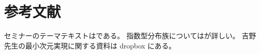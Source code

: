 \documentclass[report, notitlepage]{jlreq}
\begin{document}
\tableofcontents
\markboth{\contentsname}{}

%


%


%


%




%
\newpage
{}
{}
\renewcommand{\bibname}{参考文献}
\markboth{\bibname}{}
\part*{参考文献}

セミナーのテーマテキストは\cite{amari_information_2016}である。
指数型分布族については\cite{BN78}が詳しい。
吉野先生の最小次元実現に関する資料\cite{bn1970_pdf}は dropbox にある。

\nocite{amari_methods_2007}
\nocite{wainwright_graphical_2007}
\nocite{dudley_18466_2003}
\nocite{brown_fundamentals_1986}
\nocite{ay_information_2017}

{
    \renewcommand{\bibsection}{}
    
    
}

%
\newpage
{}
{}
\printglossary[title={記号一覧}]

%
\newpage
{}
{}
\printindex
\end{document}
